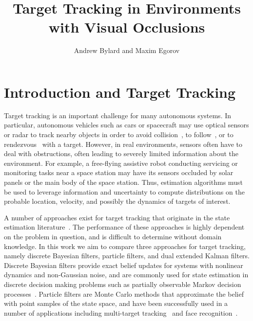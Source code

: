 \documentclass[11pt, oneside]{article}   	%
\title{Target Tracking in Environments with Visual Occlusions}
\author{Andrew Bylard and Maxim Egorov}
\begin{document}
\maketitle

\section{Introduction and Target Tracking}

Target tracking is an important challenge for many autonomous systems. In particular, autonomous vehicles such as cars or spacecraft may use optical sensors or radar to track nearby objects in order to avoid collision~\cite{tsalatsanis2007vision}, to follow~\cite{rafi2006autonomous}, or to rendezvous~\cite{xu2010autonomous} with a target.  However, in real environments, sensors often have to deal with obstructions, often leading to severely limited information about the environment. For example, a free-flying assistive robot conducting servicing or monitoring tasks near a space station may have its sensors occluded by solar panels or the main body of the space station. Thus, estimation algorithms must be used to leverage information and uncertainty to compute distributions on the probable location, velocity, and possibly the dynamics of targets of interest.


A number of approaches exist for target tracking that originate in the state estimation literature~\cite{li2005survey}. The performance of these approaches is highly dependent on the problem in question, and is difficult to determine without domain knowledge. In this work we aim to compare three approaches for target tracking, namely discrete Bayesian filters, particle filters, and dual extended Kalman filters. Discrete Bayesian filters provide exact belief updates for systems with nonlinear dynamics and non-Gaussian noise, and are commonly used for state estimation in discrete decision making problems such as partially observable Markov decision processes~\cite{kochenderfer2015decision}. Particle filters are Monte Carlo methods that approximate the belief with point samples of the state space, and have been successfully used in a number of applications including multi-target tracking~\cite{okuma2004boosted} and face recognition~\cite{zhou2004visual}. 
\end{document}
